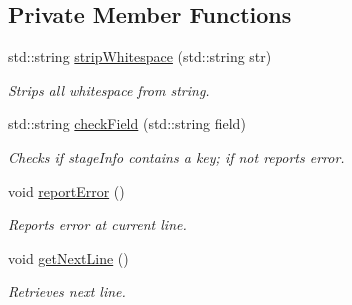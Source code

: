 \subsection*{Private Member Functions}
\begin{DoxyCompactItemize}
\item 
std\+::string \hyperlink{class_stage_loader_a4a9e517ca2cc71f73819caac034fc5a6}{strip\+Whitespace} (std\+::string str)
\begin{DoxyCompactList}\small\item\em Strips all whitespace from string. \end{DoxyCompactList}\item 
std\+::string \hyperlink{class_stage_loader_ad69aac2054f04e4ea393ae0b992416c5}{check\+Field} (std\+::string field)
\begin{DoxyCompactList}\small\item\em Checks if stage\+Info contains a key; if not reports error. \end{DoxyCompactList}\item 
void \hyperlink{class_stage_loader_a686383910433f0d5a8109e01b1ede249}{report\+Error} ()\hypertarget{class_stage_loader_a686383910433f0d5a8109e01b1ede249}{}\label{class_stage_loader_a686383910433f0d5a8109e01b1ede249}

\begin{DoxyCompactList}\small\item\em Reports error at current line. \end{DoxyCompactList}\item 
void \hyperlink{class_stage_loader_a691e32f2cea41a78d6a6e99611acb0a6}{get\+Next\+Line} ()\hypertarget{class_stage_loader_a691e32f2cea41a78d6a6e99611acb0a6}{}\label{class_stage_loader_a691e32f2cea41a78d6a6e99611acb0a6}

\begin{DoxyCompactList}\small\item\em Retrieves next line. \end{DoxyCompactList}\end{DoxyCompactItemize}
